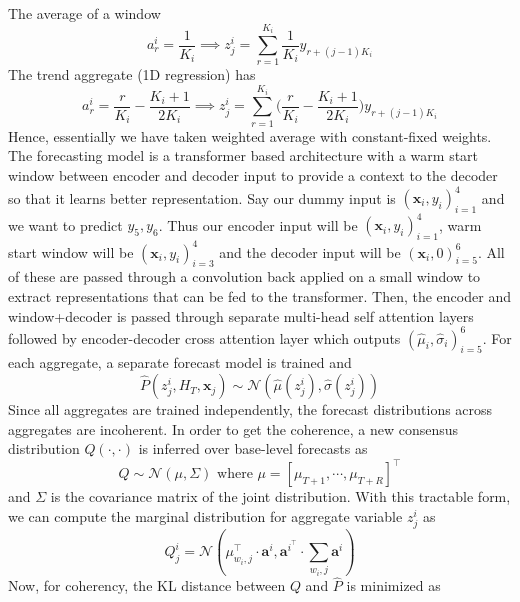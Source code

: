 The average of a window
\begin{equation}
	a_r^i = \dfrac{1}{K_i} \implies z_j^i = \sum_{r=1}^{K_i} \dfrac{1}{K_i} y_{r+(j-1)K_i}
\end{equation}
The trend aggregate (1D regression) has
\begin{equation}
	a_r^i = \dfrac{r}{K_i} - \dfrac{K_i+1}{2K_i} \implies z_j^i = \sum_{r=1}^{K_i} \bigg(\dfrac{r}{K_i} - \dfrac{K_i+1}{2K_i}\bigg) y_{r+(j-1)K_i}
\end{equation}
Hence, essentially we have taken weighted average with constant-fixed weights. \\
The forecasting model is a transformer based architecture with a warm start window between encoder and decoder input to provide a context to the decoder so that it learns better representation. Say our dummy input is $(\mathbf x_i, y_i)_{i=1}^4$ and we want to predict $y_5, y_6$. Thus our encoder input will be $(\mathbf x_i, y_i)_{i=1}^4$, warm start window will be $(\mathbf x_i, y_i)_{i=3}^4$ and the decoder input will be $(\mathbf x_i, 0)_{i=5}^6$. All of these are passed through a convolution back applied on a small window to extract representations that can be fed to the transformer. Then, the encoder and window+decoder is passed through separate multi-head self attention layers followed by encoder-decoder cross attention layer which outputs $(\widehat{\mu}_i, \widehat{\sigma}_i)_{i=5}^6$. For each aggregate, a separate forecast model is trained and
\begin{equation}
	\widehat{P}(z_j^i, H_T, \mathbf{x}_j) \sim \mathcal{N}(\widehat{\mu}(z_j^i), \widehat{\sigma}(z_j^i))
\end{equation}
Since all aggregates are trained independently, the forecast distributions across aggregates are incoherent. In order to get the coherence, a new consensus distribution $Q(\cdot, \cdot)$ is inferred over base-level forecasts as
\begin{equation}
	Q \sim \mathcal{N}(\mu, \Sigma) \text{ where }\mu = [\mu_{T+1}, \cdots, \mu_{T+R}]^\top
\end{equation}
and $\Sigma$ is the covariance matrix of the joint distribution. With this tractable form, we can compute the marginal distribution for aggregate variable $z_j^i$ as 
\begin{equation}
	Q_j^i = \mathcal{N}(\mu^\top_{w_i, j} \cdot \mathbf{a}^i, \mathbf{a}^{i^\top} \cdot \sum_{w_i, j} \mathbf{a}^i)
\end{equation}
Now, for coherency, the KL distance between $Q$ and $\widehat{P}$ is minimized as

